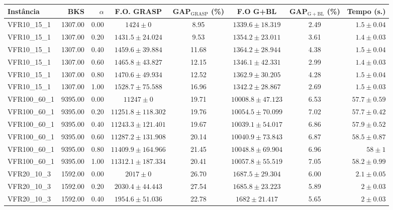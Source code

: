 \begin{longtable}{lrrccccr}
\toprule
 Instância & BKS & $\alpha$ & F.O. GRASP & GAP$_\mathrm{GRASP}$ (\%) & F.O G+BL & GAP$_\mathrm{G+BL}$ (\%) & Tempo (s.) \\ 
\midrule
\endhead

\bottomrule
\endfoot


 VFR10\_15\_1 & 1307.00 & 0.00 & $1424 \pm 0$ & 8.95 & $1339.6 \pm 18.319$ & 2.49 & $1.5 \pm 0.04$ \\ 
  VFR10\_15\_1 & 1307.00 & 0.20 & $1431.5 \pm 24.024$ & 9.53 & $1354.2 \pm 23.011$ & 3.61 & $1.4 \pm 0.03$ \\ 
  VFR10\_15\_1 & 1307.00 & 0.40 & $1459.6 \pm 39.884$ & 11.68 & $1364.2 \pm 28.944$ & 4.38 & $1.5 \pm 0.04$ \\ 
  VFR10\_15\_1 & 1307.00 & 0.60 & $1465.8 \pm 43.827$ & 12.15 & $1346.1 \pm 42.331$ & 2.99 & $1.4 \pm 0.03$ \\ 
  VFR10\_15\_1 & 1307.00 & 0.80 & $1470.6 \pm 49.934$ & 12.52 & $1362.9 \pm 30.205$ & 4.28 & $1.5 \pm 0.04$ \\ 
  VFR10\_15\_1 & 1307.00 & 1.00 & $1528.7 \pm 75.588$ & 16.96 & $1342.2 \pm 28.867$ & 2.69 & $1.5 \pm 0.03$ \\ 
   \midrule
VFR100\_60\_1 & 9395.00 & 0.00 & $11247 \pm 0$ & 19.71 & $10008.8 \pm 47.123$ & 6.53 & $57.7 \pm 0.59$ \\ 
  VFR100\_60\_1 & 9395.00 & 0.20 & $11251.8 \pm 118.302$ & 19.76 & $10054.5 \pm 70.099$ & 7.02 & $57.7 \pm 0.42$ \\ 
  VFR100\_60\_1 & 9395.00 & 0.40 & $11243.3 \pm 121.401$ & 19.67 & $10039.1 \pm 54.017$ & 6.86 & $57.9 \pm 0.52$ \\ 
  VFR100\_60\_1 & 9395.00 & 0.60 & $11287.2 \pm 131.908$ & 20.14 & $10040.9 \pm 73.843$ & 6.87 & $58.5 \pm 0.87$ \\ 
  VFR100\_60\_1 & 9395.00 & 0.80 & $11409.9 \pm 164.966$ & 21.45 & $10048.8 \pm 69.904$ & 6.96 & $58 \pm 1$ \\ 
  VFR100\_60\_1 & 9395.00 & 1.00 & $11312.1 \pm 187.334$ & 20.41 & $10057.8 \pm 55.519$ & 7.05 & $58.2 \pm 0.99$ \\ 
   \midrule
VFR20\_10\_3 & 1592.00 & 0.00 & $2017 \pm 0$ & 26.70 & $1687.5 \pm 29.304$ & 6.00 & $2.1 \pm 0.05$ \\ 
  VFR20\_10\_3 & 1592.00 & 0.20 & $2030.4 \pm 44.443$ & 27.54 & $1685.8 \pm 23.223$ & 5.89 & $2 \pm 0.03$ \\ 
  VFR20\_10\_3 & 1592.00 & 0.40 & $1954.6 \pm 51.036$ & 22.78 & $1682 \pm 21.417$ & 5.65 & $2 \pm 0.03$ \\ 

\end{longtable}
